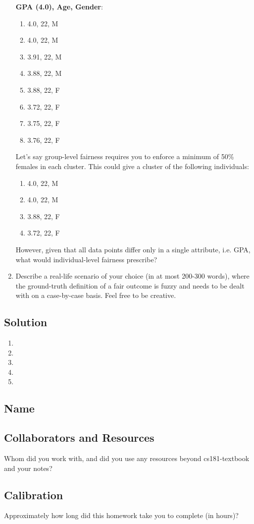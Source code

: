\documentclass[submit]{harvardml}
\begin{document}
\begin{problem}
\begin{enumerate}
    \textbf{GPA (4.0), Age, Gender}:
    \begin{enumerate}
    \item 4.0, 22, M
    \item 4.0, 22, M
    \item 3.91, 22, M
    \item 3.88, 22, M
    \item 3.88, 22, F
    \item 3.72, 22, F
    \item 3.75, 22, F
    \item 3.76, 22, F
    \end{enumerate}


Let’s say group-level fairness requires you to enforce a minimum of 50\% females in each cluster. This could give a cluster of the following individuals:

\begin{enumerate}
    \item 4.0, 22, M
    \item 4.0, 22, M
    \item 3.88, 22, F
    \item 3.72, 22, F
\end{enumerate}

However, given that all data points differ only in a single attribute, i.e. GPA, what would individual-level fairness prescribe?

\item Describe a real-life scenario of your choice (in at most 200-300 words), where the ground-truth definition of a fair outcome is fuzzy and needs to be dealt with on a case-by-case basis. Feel free to be creative. 

\end{enumerate}

\end{problem}

\subsection*{Solution}
\begin{enumerate}
  \item 
  \item 
  \item 
  \item 
  \item 
\end{enumerate}

\newpage
\subsection*{Name}

\subsection*{Collaborators and Resources}
Whom did you work with, and did you use any resources beyond cs181-textbook and your notes?

\subsection*{Calibration}
Approximately how long did this homework take you to complete (in hours)? 
\end{document}
